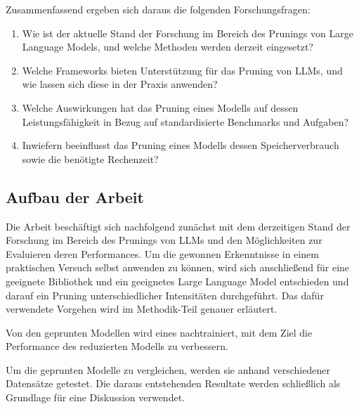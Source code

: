 Zusammenfassend ergeben sich daraus die folgenden Forschungsfragen:

\begin{enumerate}
	\item Wie ist der aktuelle Stand der Forschung im Bereich des
	      Prunings von Large Language Models, und welche Methoden werden derzeit
	      eingesetzt?
	\item Welche Frameworks bieten Unterstützung für das Pruning von
	      LLMs, und wie lassen sich diese in der Praxis anwenden?
	\item Welche
	      Auswirkungen hat das Pruning eines Modells auf dessen Leistungsfähigkeit in
	      Bezug auf standardisierte Benchmarks und Aufgaben?
	\item Inwiefern
	      beeinflusst das Pruning eines Modells dessen Speicherverbrauch sowie die
	      benötigte Rechenzeit?
\end{enumerate}


\subsection{Aufbau der Arbeit}

Die Arbeit beschäftigt sich nachfolgend zunächst mit dem derzeitigen Stand der
Forschung im Bereich des Prunings von LLMs und den Möglichkeiten zur Evaluieren
deren Performances. Um die gewonnen Erkenntnisse in einem praktischen Versuch
selbst anwenden zu können, wird sich anschließend für eine geeignete Bibliothek
und ein geeignetes Large Language Model entschieden und darauf ein Pruning
unterschiedlicher Intensitäten durchgeführt. Das dafür verwendete Vorgehen wird
im Methodik-Teil genauer erläutert.

Von den geprunten Modellen wird eines nachtrainiert, mit dem Ziel die
Performance des reduzierten Modells zu verbessern.

Um die geprunten Modelle zu vergleichen, werden sie anhand verschiedener
Datensätze getestet. Die daraus entstehenden Resultate werden schließlich als
Grundlage für eine Diskussion verwendet.

